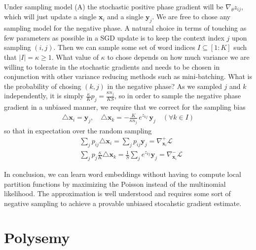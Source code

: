 \documentclass{article}
\newcommand{\logl}{{\mathcal L}}
\newcommand{\x}{{\mathbf x}}
\newcommand{\y}{{\mathbf y}}
\begin{document}
Under sampling model (A) the stochastic positive phase gradient will be $\nabla_\theta z_{ij}$, which will just update a single $\x_i$ and a single $\y_j$. We are free to chose any sampling model for the negative phase. A natural choice in terms of touching as few parameters as possible in a SGD update is to keep the context index $j$ upon sampling $(i,j)$. Then we can sample some set of word indices $I \subseteq [1:K]$ such that $| I | = \kappa \geq 1$. What value of $\kappa$ to chose depends on how much variance we are willing to tolerate in the stochastic gradients and needs to be chosen in conjunction with other variance reducing methods such as mini-batching. What is the probability of chosing $(k,j)$ in the negative phase? As we sampled $j$ and $k$ independently, it is simply $\frac{\kappa}{K} p_j = \frac{\kappa n_j}{K S}$, so in order to sample the negative phase  gradient in a unbiased manner, we require that we correct for the sampling bias
\begin{align}
\triangle \x_i = \y_j, \quad  \triangle \x_k = - \frac{K}{\kappa n_{j}} \, e^{z_{kj}} \, \y_j  \quad (\forall k \in I)
\end{align}
so that in expectation over the random sampling 
\begin{align}
& \sum_{j} p_{ij} \triangle \x_i = \sum_j p_{ij} \y_j = \nabla^+_{\x_i} \logl \\
& \sum_{j} p_{j} \frac{\kappa}{K} \triangle \x_k = \frac 1S \sum_j e^{z_{kj}} \y_j = \nabla^-_{\x_i} \logl
\end{align}

In conclusion, we can learn word embeddings without having to compute local partition functions by  maximizing the Poisson instead of the multinomial likelihood. The approximation is well understood and requires some sort of negative sampling to achieve a provable unbiased stocahstic gradient estimate. 

\section{Polysemy}
\end{document}
